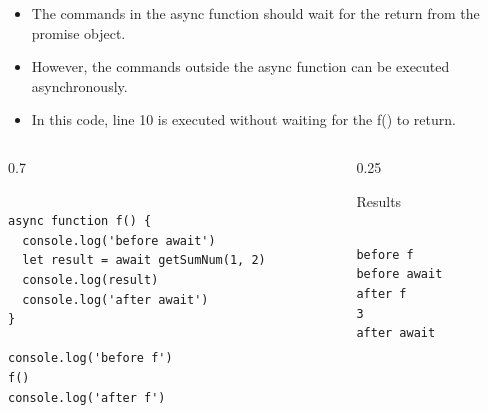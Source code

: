 \begin{frame}[fragile]{}

\begin{itemize}
	\item The commands in the async function should wait for the return from the promise object.
	\item However, the commands outside the async function can be executed asynchronously. 
	\item In this code, line 10 is executed without waiting for the f() to return.  
\end{itemize}

\begin{columns}%
\begin{column}{0.7\textwidth}%
\begin{Code}{}%
\begin{lstlisting}[firstnumber=1, label=glabels, xleftmargin=0pt, basicstyle=\tiny]% 

async function f() {
  console.log('before await')
  let result = await getSumNum(1, 2)
  console.log(result)
  console.log('after await')
}

console.log('before f')
f()
console.log('after f')
\end{lstlisting}%
\end{Code}%
\end{column}%
\begin{column}{0.25\textwidth}%
\begin{Command}{Results}%
\begin{lstlisting}[firstnumber=1, label=glabels, xleftmargin=0pt, basicstyle=\tiny]% 

before f
before await
after f
3
after await
\end{lstlisting}%
\end{Command}%
\end{column}%
\end{columns}%
\end{frame}

